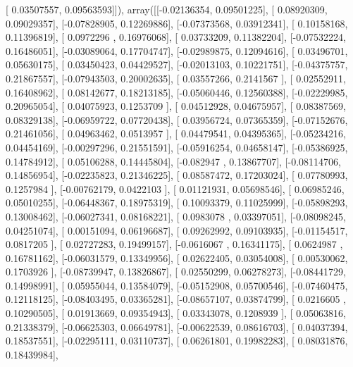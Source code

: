 \documentclass{article}
\begin{document}
       [ 0.03507557,  0.09563593]]), array([[-0.02136354,  0.09501225],
       [ 0.08920309,  0.09029357],
       [-0.07828905,  0.12269886],
       [-0.07373568,  0.03912341],
       [ 0.10158168,  0.11396819],
       [ 0.0972296 ,  0.16976068],
       [ 0.03733209,  0.11382204],
       [-0.07532224,  0.16486051],
       [-0.03089064,  0.17704747],
       [-0.02989875,  0.12094616],
       [ 0.03496701,  0.05630175],
       [ 0.03450423,  0.04429527],
       [-0.02013103,  0.10221751],
       [-0.04375757,  0.21867557],
       [-0.07943503,  0.20002635],
       [ 0.03557266,  0.2141567 ],
       [ 0.02552911,  0.16408962],
       [ 0.08142677,  0.18213185],
       [-0.05060446,  0.12560388],
       [-0.02229985,  0.20965054],
       [ 0.04075923,  0.1253709 ],
       [ 0.04512928,  0.04675957],
       [ 0.08387569,  0.08329138],
       [-0.06959722,  0.07720438],
       [ 0.03956724,  0.07365359],
       [-0.07152676,  0.21461056],
       [ 0.04963462,  0.0513957 ],
       [ 0.04479541,  0.04395365],
       [-0.05234216,  0.04454169],
       [-0.00297296,  0.21551591],
       [-0.05916254,  0.04658147],
       [-0.05386925,  0.14784912],
       [ 0.05106288,  0.14445804],
       [-0.082947  ,  0.13867707],
       [-0.08114706,  0.14856954],
       [-0.02235823,  0.21346225],
       [ 0.08587472,  0.17203024],
       [ 0.07780993,  0.1257984 ],
       [-0.00762179,  0.0422103 ],
       [ 0.01121931,  0.05698546],
       [ 0.06985246,  0.05010255],
       [-0.06448367,  0.18975319],
       [ 0.10093379,  0.11025999],
       [-0.05898293,  0.13008462],
       [-0.06027341,  0.08168221],
       [ 0.0983078 ,  0.03397051],
       [-0.08098245,  0.04251074],
       [ 0.00151094,  0.06196687],
       [ 0.09262992,  0.09103935],
       [-0.01154517,  0.0817205 ],
       [ 0.02727283,  0.19499157],
       [-0.0616067 ,  0.16341175],
       [ 0.0624987 ,  0.16781162],
       [-0.06031579,  0.13349956],
       [ 0.02622405,  0.03054008],
       [ 0.00530062,  0.1703926 ],
       [-0.08739947,  0.13826867],
       [ 0.02550299,  0.06278273],
       [-0.08441729,  0.14998991],
       [ 0.05955044,  0.13584079],
       [-0.05152908,  0.05700546],
       [-0.07460475,  0.12118125],
       [-0.08403495,  0.03365281],
       [-0.08657107,  0.03874799],
       [ 0.0216605 ,  0.10290505],
       [ 0.01913669,  0.09354943],
       [ 0.03343078,  0.1208939 ],
       [ 0.05063816,  0.21338379],
       [-0.06625303,  0.06649781],
       [-0.00622539,  0.08616703],
       [ 0.04037394,  0.18537551],
       [-0.02295111,  0.03110737],
       [ 0.06261801,  0.19982283],
       [ 0.08031876,  0.18439984],
\end{document}

